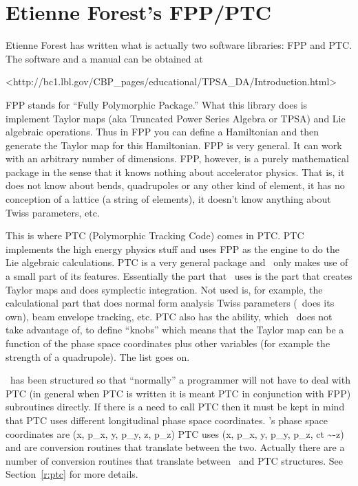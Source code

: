 \chapter{Etienne Forest's FPP/PTC}
\label{c:etienne}


Etienne Forest has written what is actually two software libraries:
FPP and PTC. The software and a manual can be obtained at
\begin{example} 
    <http://bc1.lbl.gov/CBP_pages/educational/TPSA_DA/Introduction.html>
\end{example}

FPP stands for ``Fully Polymorphic Package.'' What this library does
is implement Taylor maps (aka Truncated Power Series Algebra or TPSA)
and Lie algebraic operations. Thus in FPP you can define a Hamiltonian
and then generate the Taylor map for this Hamiltonian. FPP is very
general. It can work with an arbitrary number of dimensions.  FPP,
however, is a purely mathematical package in the sense that it knows
nothing about accelerator physics. That is, it does not know about
bends, quadrupoles or any other kind of element, it has no conception
of a lattice (a string of elements), it doesn't know anything about
Twiss parameters, etc.

This is where PTC (Polymorphic Tracking Code) comes in PTC. PTC
implements the high energy physics stuff and uses FPP as the engine to
do the Lie algebraic calculations.  PTC is a very general package and
\bmad\ only makes use of a small part of its features. Essentially
the part that \bmad\ uses is the part that creates Taylor maps and
does symplectic integration. Not used is, for example, the
calculational part that does normal form analysis Twiss parameters
(\bmad\ does its own), beam envelope tracking, etc. PTC also has the
ability, which \bmad\ does not take advantage of, to define ``knobs''
which means that the Taylor map can be a function of the phase space
coordinates plus other variables (for example the strength of a
quadrupole). The list goes on. 

\bmad\ has been structured so that ``normally'' a programmer will not have
to deal with PTC (in general when PTC is written it is meant PTC in
conjunction with FPP) subroutines directly. If there is a need to
call PTC then it must be kept in mind that PTC uses different
longitudinal phase space coordinates.
\bmad's phase space coordinates are
\Begineq
  (x, p_x, y, p_y, z, p_z)
\Endeq
PTC uses
\Begineq
  (x, p_x, y, p_y, p_z, ct \sim -z)
\Endeq
{} and  are conversion routines
that translate between the two. Actually there are a number of
conversion routines that translate between \bmad\ and PTC
structures. See Section~\ref{r:ptc} for more details.

